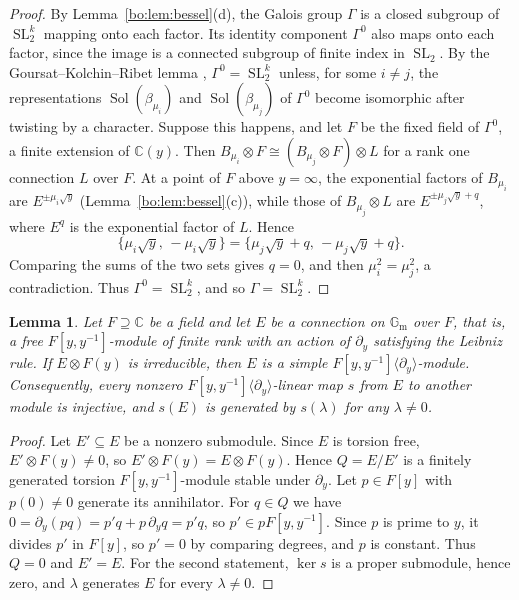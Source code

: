 \documentclass[11pt,a4paper]{article}
\newtheorem{lemma}[theorem]{Lemma}
\theoremstyle{definition}
\theoremstyle{remark}
\numberwithin{equation}{section}
\newcommand{\C}{\mathbb{C}}
\DeclareMathOperator{\Sol}{Sol}
\DeclareMathOperator{\SL}{SL}
\newcommand{\Gm}{\mathbb{G}_{\mathrm{m}}}
\begin{document}
\begin{proof}
By Lemma~\ref{bo:lem:bessel}(d), the Galois group $\Gamma$ is a closed subgroup of $\SL_2^k$ mapping onto each factor. Its identity component $\Gamma^0$ also maps onto each factor, since the image is a connected subgroup of finite index in $\SL_2$. By the Goursat--Kolchin--Ribet lemma \cite[Prop.~1.8.2]{Kat90}, $\Gamma^0=\SL_2^k$ unless, for some $i\ne j$, the representations $\Sol(\beta_{\mu_i})$ and $\Sol(\beta_{\mu_j})$ of $\Gamma^0$ become isomorphic after twisting by a character. Suppose this happens, and let $F$ be the fixed field of $\Gamma^0$, a finite extension of $\C(y)$. Then $B_{\mu_i}\otimes F\cong(B_{\mu_j}\otimes F)\otimes L$ for a rank one connection $L$ over $F$. At a point of $F$ above $y=\infty$, the exponential factors of $B_{\mu_i}$ are $E^{\pm\mu_i\sqrt y}$ (Lemma~\ref{bo:lem:bessel}(c)), while those of $B_{\mu_j}\otimes L$ are $E^{\pm\mu_j\sqrt y+q}$, where $E^q$ is the exponential factor of $L$. Hence
\[
\{\mu_i\sqrt y,\,-\mu_i\sqrt y\}=\{\mu_j\sqrt y+q,\,-\mu_j\sqrt y+q\}.
\]
Comparing the sums of the two sets gives $q=0$, and then $\mu_i^2=\mu_j^2$, a contradiction. Thus $\Gamma^0=\SL_2^k$, and so $\Gamma=\SL_2^k$.
\end{proof}

\begin{lemma}\label{bo:lem:simple}
Let $F\supseteq\C$ be a field and let $E$ be a connection on $\Gm$ over $F$, that is, a free $F[y,y^{-1}]$-module of finite rank with an action of $\partial_y$ satisfying the Leibniz rule. If $E\otimes F(y)$ is irreducible, then $E$ is a simple $F[y,y^{-1}]\langle\partial_y\rangle$-module. Consequently, every nonzero $F[y,y^{-1}]\langle\partial_y\rangle$-linear map $s$ from $E$ to another module is injective, and $s(E)$ is generated by $s(\lambda)$ for any $\lambda\ne0$.
\end{lemma}

\begin{proof}
Let $E'\subseteq E$ be a nonzero submodule. Since $E$ is torsion free, $E'\otimes F(y)\ne0$, so $E'\otimes F(y)=E\otimes F(y)$. Hence $Q=E/E'$ is a finitely generated torsion $F[y,y^{-1}]$-module stable under $\partial_y$. Let $p\in F[y]$ with $p(0)\ne0$ generate its annihilator. For $q\in Q$ we have $0=\partial_y(pq)=p'q+p\,\partial_yq=p'q$, so $p'\in pF[y,y^{-1}]$. Since $p$ is prime to $y$, it divides $p'$ in $F[y]$, so $p'=0$ by comparing degrees, and $p$ is constant. Thus $Q=0$ and $E'=E$. For the second statement, $\ker s$ is a proper submodule, hence zero, and $\lambda$ generates $E$ for every $\lambda\ne0$.
\end{proof}
\end{document}

